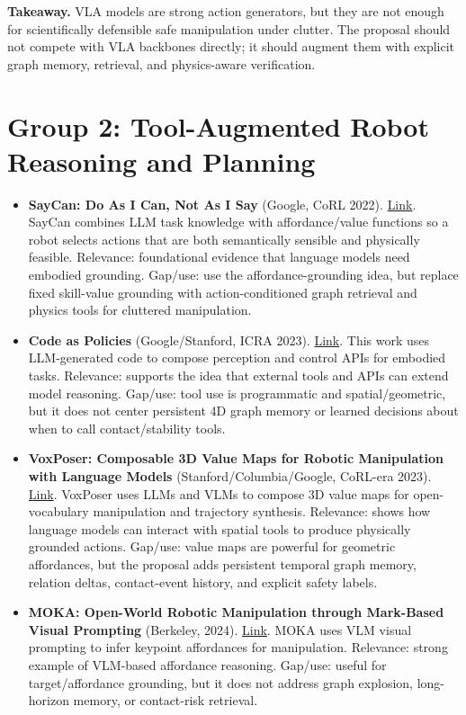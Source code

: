 \textbf{Takeaway.} VLA models are strong action generators, but they are not enough for scientifically defensible safe manipulation under clutter. The proposal should not compete with VLA backbones directly; it should augment them with explicit graph memory, retrieval, and physics-aware verification.

\section*{Group 2: Tool-Augmented Robot Reasoning and Planning}

\begin{itemize}
\item \textbf{SayCan: Do As I Can, Not As I Say} (Google, CoRL 2022). \href{https://arxiv.org/abs/2204.01691}{Link}. SayCan combines LLM task knowledge with affordance/value functions so a robot selects actions that are both semantically sensible and physically feasible. Relevance: foundational evidence that language models need embodied grounding. Gap/use: use the affordance-grounding idea, but replace fixed skill-value grounding with action-conditioned graph retrieval and physics tools for cluttered manipulation.

\item \textbf{Code as Policies} (Google/Stanford, ICRA 2023). \href{https://arxiv.org/abs/2209.07753}{Link}. This work uses LLM-generated code to compose perception and control APIs for embodied tasks. Relevance: supports the idea that external tools and APIs can extend model reasoning. Gap/use: tool use is programmatic and spatial/geometric, but it does not center persistent 4D graph memory or learned decisions about when to call contact/stability tools.

\item \textbf{VoxPoser: Composable 3D Value Maps for Robotic Manipulation with Language Models} (Stanford/Columbia/Google, CoRL-era 2023). \href{https://arxiv.org/abs/2307.05973}{Link}. VoxPoser uses LLMs and VLMs to compose 3D value maps for open-vocabulary manipulation and trajectory synthesis. Relevance: shows how language models can interact with spatial tools to produce physically grounded actions. Gap/use: value maps are powerful for geometric affordances, but the proposal adds persistent temporal graph memory, relation deltas, contact-event history, and explicit safety labels.

\item \textbf{MOKA: Open-World Robotic Manipulation through Mark-Based Visual Prompting} (Berkeley, 2024). \href{https://arxiv.org/abs/2403.03174}{Link}. MOKA uses VLM visual prompting to infer keypoint affordances for manipulation. Relevance: strong example of VLM-based affordance reasoning. Gap/use: useful for target/affordance grounding, but it does not address graph explosion, long-horizon memory, or contact-risk retrieval.
\end{itemize}

